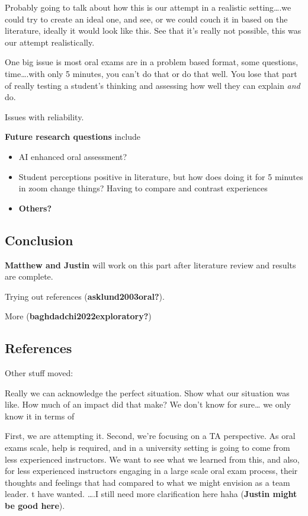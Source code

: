\documentclass[
  letterpaper,
  DIV=11,
  numbers=noendperiod]{scrartcl}
\providecommand{\tightlist}{%
  \setlength{\itemsep}{0pt}\setlength{\parskip}{0pt}}\usepackage{longtable,booktabs,array}
\begin{document}
Probably going to talk about how this is our attempt in a realistic
setting\ldots.we could try to create an ideal one, and see, or we could
couch it in based on the literature, ideally it would look like this.
See that it's really not possible, this was our attempt realistically.

One big issue is most oral exams are in a problem based format, some
questions, time\ldots.with only 5 minutes, you can't do that or do that
well. You lose that part of really testing a student's thinking and
assessing how well they can explain \emph{and} do.

Issues with reliability.

\textbf{Future research questions} include

\begin{itemize}
\tightlist
\item
  AI enhanced oral assessment?
\item
  Student perceptions positive in literature, but how does doing it for
  5 minutes in zoom change things? Having to compare and contrast
  experiences
\item
  \textbf{Others?}
\end{itemize}

\hypertarget{conclusion}{%
\subsection{Conclusion}\label{conclusion}}

\textbf{Matthew and Justin} will work on this part after literature
review and results are complete.

Trying out references (\textbf{asklund2003oral?}).

More (\textbf{baghdadchi2022exploratory?})

\hypertarget{references}{%
\subsection{References}\label{references}}

Other stuff moved:

Really we can acknowledge the perfect situation. Show what our situation
was like. How much of an impact did that make? We don't know for
sure\ldots{} we only know it in terms of

First, we are attempting it. Second, we're focusing on a TA perspective.
As oral exams scale, help is required, and in a university setting is
going to come from less experienced instructors. We want to see what we
learned from this, and also, for less experienced instructors engaging
in a large scale oral exam process, their thoughts and feelings that had
compared to what we might envision as a team leader. t have wanted.
\ldots.I still need more clarification here haha (\textbf{Justin might
be good here}).
\end{document}
